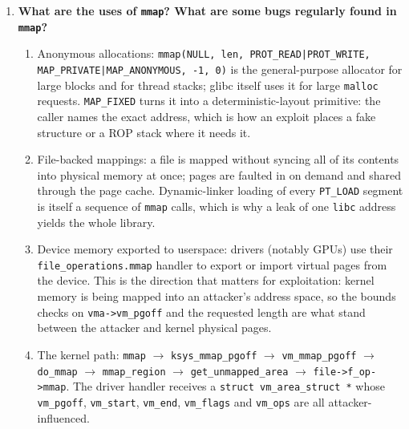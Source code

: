 \documentclass[12pt]{Training}
\begin{document}
\begin{enumerate}
\begin{enumerate}
        \item Reading another process's \lstinline{/proc/<pid>/maps} requires \lstinline{PTRACE_MODE_READ}, enforced by \lstinline{ptrace_may_access()}. That is the same permission check that gates \lstinline{/proc/<pid>/mem} and \lstinline{process_vm_readv}, so an Android app cannot read another app's layout even though the DAC mode bits are world-readable.
        \item Related interfaces in the same family: \lstinline{/proc/self/smaps} (per-mapping resident, dirty and swap accounting, plus the kernel's page size), \lstinline{/proc/self/smaps_rollup} (the aggregate), \lstinline{/proc/self/map_files} (symlinks from each range to its backing file) and \lstinline{/proc/self/numa_maps}. When \lstinline{maps} is insufficient, \lstinline{smaps} shows whether a page is shared, which decides whether a heap groom can touch it.
    \end{enumerate}
    \item \textbf{What are the uses of \lstinline{mmap}? What are some bugs regularly found in \lstinline{mmap}?}
    \begin{enumerate}
        \item Anonymous allocations: \lstinline{mmap(NULL, len, PROT_READ|PROT_WRITE, MAP_PRIVATE|MAP_ANONYMOUS, -1, 0)} is the general-purpose allocator for large blocks and for thread stacks; glibc itself uses it for large \lstinline{malloc} requests. \lstinline{MAP_FIXED} turns it into a deterministic-layout primitive: the caller names the exact address, which is how an exploit places a fake structure or a ROP stack where it needs it.
        \item File-backed mappings: a file is mapped without syncing all of its contents into physical memory at once; pages are faulted in on demand and shared through the page cache. Dynamic-linker loading of every \lstinline{PT_LOAD} segment is itself a sequence of \lstinline{mmap} calls, which is why a leak of one \lstinline{libc} address yields the whole library.
        \item Device memory exported to userspace: drivers (notably GPUs) use their \lstinline{file_operations.mmap} handler to export or import virtual pages from the device. This is the direction that matters for exploitation: kernel memory is being mapped into an attacker's address space, so the bounds checks on \lstinline{vma->vm_pgoff} and the requested length are what stand between the attacker and kernel physical pages.
        \item The kernel path: \lstinline{mmap} $\to$ \lstinline{ksys_mmap_pgoff} $\to$ \lstinline{vm_mmap_pgoff} $\to$ \lstinline{do_mmap} $\to$ \lstinline{mmap_region} $\to$ \lstinline{get_unmapped_area} $\to$ \lstinline{file->f_op->mmap}. The driver handler receives a \lstinline{struct vm_area_struct *} whose \lstinline{vm_pgoff}, \lstinline{vm_start}, \lstinline{vm_end}, \lstinline{vm_flags} and \lstinline{vm_ops} are all attacker-influenced.

\end{enumerate}
\end{enumerate}
\end{document}
